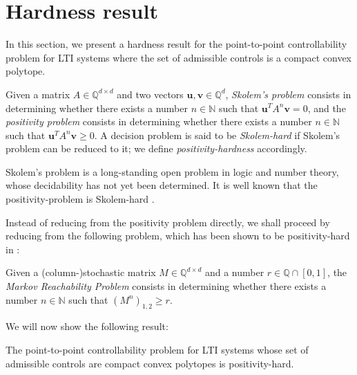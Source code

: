 \section{Hardness result}

In this section, we present a hardness result for the point-to-point controllability problem for LTI systems where the set of admissible controls is a compact convex polytope.

\begin{definition}
Given a matrix $A \in \mathbb{Q}^{d \times d}$ and two vectors
$\boldsymbol{u}, \boldsymbol{v} \in \mathbb{Q}^{d}$, \emph{Skolem's problem} consists in determining
whether there exists a number $n \in \mathbb{N}$ such that
$\boldsymbol{u}^{T} A^{n} \boldsymbol{v} = 0$, and the \emph{positivity problem} consists in determining whether there exists a number $n \in \mathbb{N}$ such that $\boldsymbol{u}^{T} A^{n} \boldsymbol{v} \geq 0$. A decision problem is said to be \emph{Skolem-hard} if Skolem's problem can be reduced to it; we define \emph{positivity-hardness} accordingly.
\end{definition}

Skolem's problem is a long-standing open problem in logic and number theory, whose decidability has not yet been determined. It is well known that the positivity-problem is Skolem-hard \cite{PP}.

Instead of reducing from the positivity problem directly, we shall proceed by reducing from the following problem, which has been shown to be positivity-hard in \cite{MRP}:
\begin{definition}
Given a (column-)stochastic matrix $M \in \mathbb{Q}^{d \times d}$ and a number $r \in \mathbb{Q} \cap [0,1]$,
the \emph{Markov Reachability Problem} consists in determining whether there exists a number $n \in \mathbb{N}$ such that $\left( M^{n} \right)_{1,2} \geq r$.
\end{definition}

We will now show the following result:

\begin{theorem}
The point-to-point controllability problem for LTI systems whose set of admissible controls are compact convex polytopes is positivity-hard.
\end{theorem}

